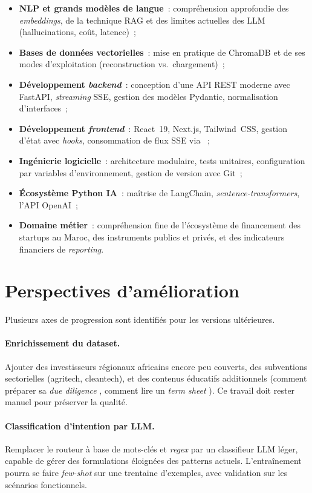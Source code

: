 \begin{itemize}
  \item \textbf{\ac{NLP} et grands modèles de langue}~: compréhension approfondie des \textit{embeddings}, de la technique \ac{RAG} et des limites actuelles des \ac{LLM} (hallucinations, coût, latence)~;
  \item \textbf{Bases de données vectorielles}~: mise en pratique de ChromaDB et de ses modes d'exploitation (reconstruction vs.\ chargement)~;
  \item \textbf{Développement \textit{backend}}~: conception d'une \ac{API} \ac{REST} moderne avec FastAPI, \textit{streaming} \ac{SSE}, gestion des modèles Pydantic, normalisation d'interfaces~;
  \item \textbf{Développement \textit{frontend}}~: React~19, Next.js, Tailwind~CSS, gestion d'état avec \textit{hooks}, consommation de flux \ac{SSE} via ~;
  \item \textbf{Ingénierie logicielle}~: architecture modulaire, tests unitaires, configuration par variables d'environnement, gestion de version avec Git~;
  \item \textbf{Écosystème Python IA}~: maîtrise de LangChain, \textit{sentence-transformers}, l'\ac{API} OpenAI~;
  \item \textbf{Domaine métier}~: compréhension fine de l'écosystème de financement des startups au Maroc, des instruments publics et privés, et des indicateurs financiers de \textit{reporting}.
\end{itemize}

\section{Perspectives d'amélioration}

Plusieurs axes de progression sont identifiés pour les versions ultérieures.

\paragraph{Enrichissement du dataset.} Ajouter des investisseurs régionaux africains encore peu couverts, des subventions sectorielles (agritech, cleantech), et des contenus éducatifs additionnels (\og comment préparer sa \textit{due diligence} \fg, \og comment lire un \textit{term sheet} \fg). Ce travail doit rester manuel pour préserver la qualité.

\paragraph{Classification d'intention par \ac{LLM}.} Remplacer le routeur à base de mots-clés et \textit{regex} par un classifieur \ac{LLM} léger, capable de gérer des formulations éloignées des patterns actuels. L'entraînement pourra se faire \textit{few-shot} sur une trentaine d'exemples, avec validation sur les scénarios fonctionnels.

